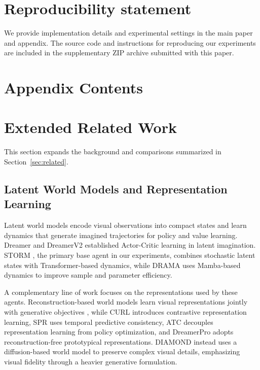 \documentclass{article} %
\begin{document}
\section*{Reproducibility statement}

We provide implementation details and experimental settings in the main paper and appendix. The source code and instructions for reproducing our experiments are included in the supplementary ZIP archive submitted with this paper.




\clearpage
\appendix
\startcontents[appendix]
\section*{Appendix Contents}
\clearpage

\section{Extended Related Work}
\label{sec:appendix_related_work}
This section expands the background and comparisons summarized in Section~\ref{sec:related}.

\subsection{Latent World Models and Representation Learning}

Latent world models encode visual observations into compact states and learn dynamics that generate imagined trajectories for policy and value learning. Dreamer \citep{hafner2019dream} and DreamerV2 \citep{hafner2020mastering} established Actor-Critic learning in latent imagination. STORM \citep{zhang2023storm}, the primary base agent in our experiments, combines stochastic latent states with Transformer-based dynamics, while DRAMA \citep{wang2025drama} uses Mamba-based dynamics to improve sample and parameter efficiency.

A complementary line of work focuses on the representations used by these agents. Reconstruction-based world models learn visual representations jointly with generative objectives \citep{hafner2019learning}, while CURL \citep{laskin2020curl} introduces contrastive representation learning, SPR \citep{schwarzer2020data} uses temporal predictive consistency, ATC \citep{stooke2021decoupling} decouples representation learning from policy optimization, and DreamerPro \citep{deng2022dreamerpro} adopts reconstruction-free prototypical representations. DIAMOND \citep{alonso2024diffusion} instead uses a diffusion-based world model to preserve complex visual details, emphasizing visual fidelity through a heavier generative formulation.
\end{document}
